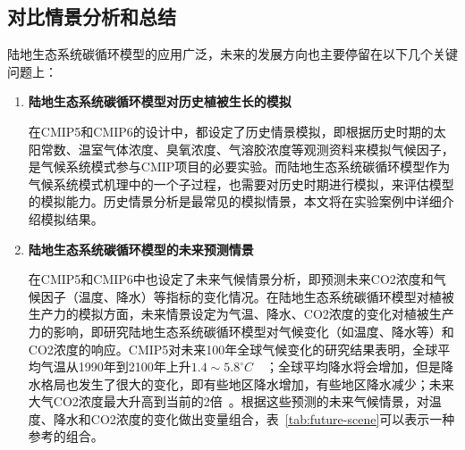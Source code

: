 \subsection{对比情景分析和总结}
\label{sec:scene}
陆地生态系统碳循环模型的应用广泛，未来的发展方向也主要停留在以下几个关键问题上：
\begin{enumerate}[(1)]
\item \textbf{陆地生态系统碳循环模型对历史植被生长的模拟}

在CMIP5和CMIP6的设计中，都设定了历史情景模拟，即根据历史时期的太阳常数、温室气体浓度、臭氧浓度、气溶胶浓度等观测资料来模拟气候因子，是气候系统模式参与CMIP项目的必要实验。而陆地生态系统碳循环模型作为气候系统模式机理中的一个子过程，也需要对历史时期进行模拟，来评估模型的模拟能力。历史情景分析是最常见的模拟情景，本文将在实验案例中详细介绍模拟结果。

\item \textbf{陆地生态系统碳循环模型的未来预测情景}

在CMIP5和CMIP6中也设定了未来气候情景分析，即预测未来CO2浓度和气候因子（温度、降水）等指标的变化情况。在陆地生态系统碳循环模型对植被生产力的模拟方面，未来情景设定为气温、降水、CO2浓度的变化对植被生产力的影响，即研究陆地生态系统碳循环模型对气候变化（如温度、降水等）和CO2浓度的响应。CMIP5对未来100年全球气候变化的研究结果表明，全球平均气温从1990年到2100年上升$1.4\sim5.8^{\circ}C$~\cite{王绍武1995未来}~\cite{秦大河2003气候变化的事实与影响及对策}；全球平均降水将会增加，但是降水格局也发生了很大的变化，即有些地区降水增加，有些地区降水减少；未来大气CO2浓度最大升高到当前的2倍~\cite{griggs2002climate}。根据这些预测的未来气候情景，对温度、降水和CO2浓度的变化做出变量组合，表~\ref{tab:future-scene}可以表示一种参考的组合。


\end{enumerate}
